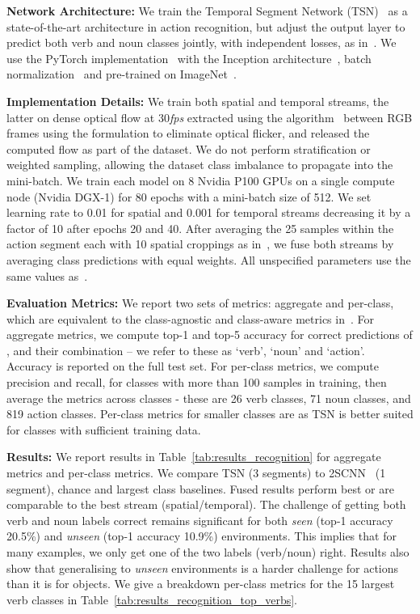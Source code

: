 \documentclass[runningheads]{llncs}
\newcommand{\fps}{\textit{fps}}
\begin{document}
\noindent\textbf{Network Architecture:}
We train the Temporal Segment Network (TSN)~\cite{wang2016tsn} as a state-of-the-art architecture in action recognition, but adjust the output layer to predict both verb and noun classes jointly, with independent losses, as in~\cite{kalogeiton2017}. We use the PyTorch implementation~\cite{tsnpytorch} with the Inception architecture~\cite{szegedy2015going}, batch normalization~\cite{ioffe2015batch} and pre-trained on ImageNet~\cite{imagenet}. 

\noindent\textbf{Implementation Details:}
We train both spatial and temporal streams, the latter on dense optical flow at 30\fps{} extracted using the  algorithm~\cite{zach2007duality} between RGB frames using the formulation  to eliminate optical flicker, and released the computed flow as part of the dataset. We do not perform stratification or weighted sampling, allowing the dataset class imbalance to propagate into the mini-batch.
We train each model on 8 Nvidia P100 GPUs on a single compute node (Nvidia DGX-1) for 80 epochs with a mini-batch size of 512. We set learning rate to 0.01 for spatial and 0.001 for temporal streams decreasing it by a factor of 10 after epochs 20 and 40. After averaging the 25 samples within the action segment each with 10 spatial croppings as in~\cite{wang2016tsn}, we fuse both streams by averaging class predictions with equal weights. All unspecified parameters use the same values as~\cite{wang2016tsn}.

\noindent\textbf{Evaluation Metrics:} We report two sets of metrics: aggregate and per-class, which are equivalent to the class-agnostic and class-aware metrics in~\cite{zhao2017slac}. For aggregate metrics, we compute top-1 and top-5 accuracy for correct predictions of ,  and their combination  -- we refer to these as `verb', `noun' and `action'. Accuracy is reported on the full test set. For per-class metrics, we compute precision and recall, for classes with more than 100 samples in training, then average the metrics across classes - these are 26 verb classes, 71 noun classes, and 819 action classes. Per-class metrics for smaller classes are  as TSN is better suited for classes with sufficient training data.

\noindent\textbf{Results:}
We report results in Table~\ref{tab:results_recognition} for aggregate metrics and per-class metrics. 
We compare TSN (3 segments) to 2SCNN~\cite{simonyan2014two} (1 segment), chance and largest class baselines.
Fused results perform best or are comparable to the best stream (spatial/temporal). The challenge of getting both verb and noun labels correct remains significant for both \textit{seen} (top-1 accuracy 20.5\%) and \textit{unseen} (top-1 accuracy 10.9\%) environments. This implies that for many examples, we only get one of the two labels (verb/noun) right.
Results also show that generalising to \textit{unseen} environments is a harder challenge for actions than it is for objects. 
We give a breakdown per-class metrics for the 15 largest verb classes in Table~\ref{tab:results_recognition_top_verbs}.
\end{document}
